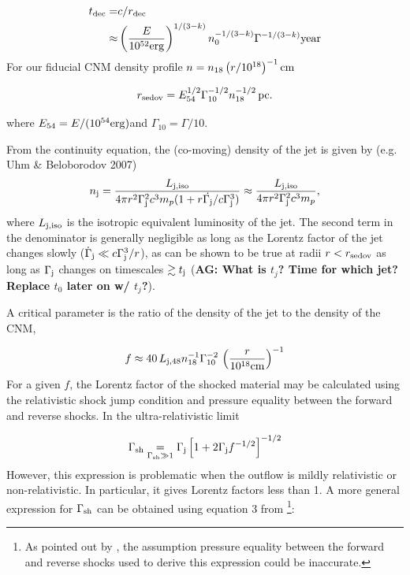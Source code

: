 \documentclass[usenatbib,fleqn]{mnras}
\begin{document}
\begin{align}
 t_{\rm dec}= &c/r_{\rm dec} \nonumber\\
 \approx & \left(\frac{E}{10^{52} {\rm erg}}\right)^{1/(3-k)}
 n_0^{-1/(3-k)} \Gamma^{-1/(3-k)}{\rm year}
 \label{eq:tdec}
\end{align}
%
For our fiducial CNM density profile $n=n_{18}\left(r/10^{18}\right)^{-1} {\rm cm}$


\begin{equation}
r_{\rm sedov} = E_{54}^{1/2} \Gamma_{10}^{-1/2} n_{\rm 18}^{-1/2}\,{\rm pc}. 
\end{equation}

\noindent where $E_{54}=E/(10^{54} {\rm erg})$and $\Gamma_{10}=\Gamma/10$.

From the continuity equation, the (co-moving) density of the jet is
given by (e.g. Uhm \& Beloborodov 2007)
 \begin{align}
   n_{\rm j} =  \frac{L_{\rm j, iso}}{4 \pi r^{2}\Gamma_{\rm
       j}^{2}c^{3}m_p(1 + r \dot{\Gamma_{\rm j}}/c\Gamma_{\rm j}^{3})}
   \approx  \frac{L_{\rm j, iso}}{4 \pi r^{2}\Gamma_{\rm j}^{2}c^{3}m_p},
\end{align}
%
where $L_{\rm j, iso}$ is the isotropic equivalent luminosity of the
jet. The second term in the denominator is generally negligible as
long as the Lorentz factor of the jet changes slowly
($\dot{\Gamma}_{\rm j} \ll c\Gamma_{\rm j}^{3}/r$), as can be shown to
be true at radii $r < r_{\rm sedov}$ as long as $\Gamma_{\rm j}$
changes on timescales $\gtrsim t_{\rm j}$ ({\bf AG: What is $t_j$?
  Time for which jet? Replace $t_0$ later on w/ $t_j$?}).

A critical parameter is the ratio of the density of the jet to the
density of the CNM,

\begin{equation}
  f\approx 40\,  L_{\rm j,48} n_{18}^{-1} \Gamma_{10}^{-2} \, \left(\frac{r}{10^{18} {\rm
        cm}}\right)^{-1} 
\end{equation}
%
For a given $f$, the Lorentz factor of the shocked material may be
calculated using the relativistic shock jump condition and pressure
equality between the forward and reverse shocks. In the
ultra-relativistic limit 

\begin{equation}
\Gamma_{\rm sh} \underset{\Gamma_{\rm sh} \gg 1}= \Gamma_{\rm j}\left[1 + 2\Gamma_{\rm j}f^{-1/2}\right]^{-1/2}
\end{equation}
%
However, this expression is problematic when the outflow is mildly
relativistic or non-relativistic. In particular, it gives Lorentz
factors less than 1. A more general expression for $\Gamma_{\rm sh}$
can be obtained using equation 3 from
\citet{Beloborodov&Uhm2006}\footnote{As pointed out by
  \citet{Beloborodov&Uhm2006}, the assumption pressure equality
  between the forward and reverse shocks used to derive this
  expression could be inaccurate.}:
\end{document}
